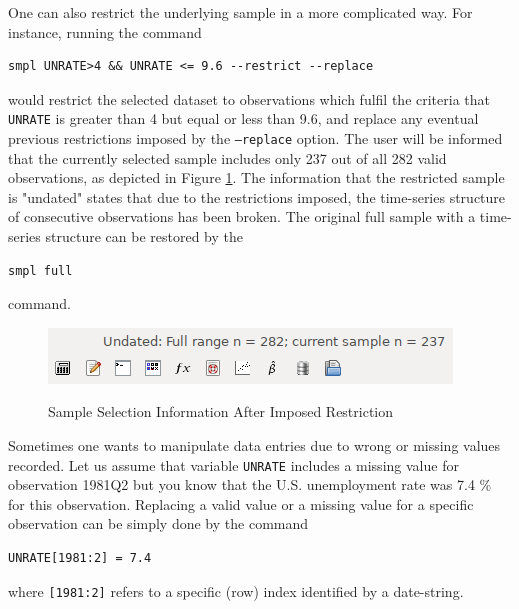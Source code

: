 \documentclass[11pt]{article}
\begin{document}
One can also restrict the underlying sample in a more complicated way. For instance, running the command 
\begin{Verbatim}[baselinestretch=0.75, fontsize=\small]
smpl UNRATE>4 && UNRATE <= 9.6 --restrict --replace
\end{Verbatim}
would restrict the selected dataset to observations which fulfil the criteria that \texttt{UNRATE} is greater than 4 but equal or less than 9.6, and replace any eventual previous restrictions imposed by the \texttt{---replace} option. %
The user will be informed that the currently selected sample includes only 237 out of all 282 valid observations, as depicted in Figure \ref{fig:smpl}. The information that the restricted sample is "undated" states that due to the restrictions imposed, the time-series structure of consecutive observations has been broken. The original full sample with a time-series structure can be restored by the
\begin{Verbatim}[baselinestretch=0.75, fontsize=\small]
smpl full
\end{Verbatim}
command.


\begin{figure}[!h]
	\centering
	\caption{Sample Selection Information After Imposed Restriction}
	\includegraphics[width=.42\textwidth]{../figures/smpl_restrict}
	\label{fig:smpl}
\end{figure}

Sometimes one wants to manipulate data entries due to wrong or missing values recorded. Let us assume that variable \texttt{UNRATE} includes a missing value for observation 1981Q2 but you know that the U.S. unemployment rate was 7.4 \% for this observation. Replacing a valid value or a missing value for a specific observation can be simply done by the command
\begin{Verbatim}[baselinestretch=0.75, fontsize=\small]
UNRATE[1981:2] = 7.4
\end{Verbatim}
where \texttt{[1981:2]} refers to a specific (row) index identified by a date-string.%
\end{document}
